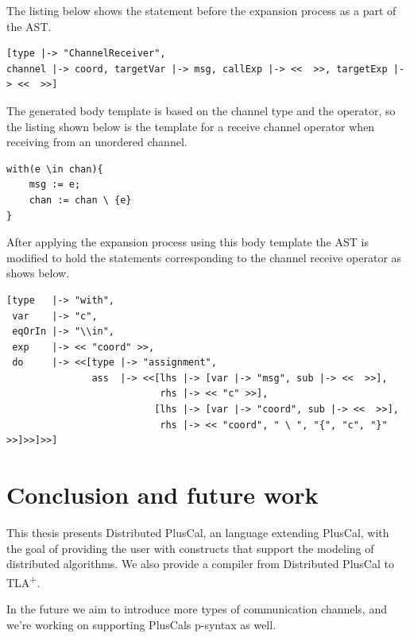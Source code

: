 \documentclass{thesul}
\newcommand{\tlaplus}{TLA\textsuperscript{+}\xspace}
\begin{document}
The listing below shows the statement before the expansion process as a part of the AST.

\begin{lstlisting}
[type |-> "ChannelReceiver",
channel |-> coord, targetVar |-> msg, callExp |-> <<  >>, targetExp |-> <<  >>]

\end{lstlisting}

The generated body template is based on the channel type and the operator, so the listing shown below is the template for a receive channel operator when receiving from an unordered channel.

\begin{lstlisting}
with(e \in chan){
	msg := e;
	chan := chan \ {e}
}
\end{lstlisting}

After applying the expansion process using this body template the AST is modified to hold the statements corresponding to the channel receive operator as shows below.

\begin{lstlisting}
[type   |-> "with", 
 var    |-> "c",
 eqOrIn |-> "\\in",
 exp    |-> << "coord" >>,
 do     |-> <<[type |-> "assignment",
               ass  |-> <<[lhs |-> [var |-> "msg", sub |-> <<  >>],
                           rhs |-> << "c" >>], 
                          [lhs |-> [var |-> "coord", sub |-> <<  >>],
                           rhs |-> << "coord", " \ ", "{", "c", "}" >>]>>]>>]

\end{lstlisting}

\label{chanexpand}
\chapter{Conclusion and future work}

This thesis presents Distributed PlusCal, an language extending PlusCal, with the goal of providing the user with constructs that support the modeling of distributed algorithms. We also provide a compiler from Distributed PlusCal to \tlaplus.

In the future we aim to introduce more types of communication channels, and we're working on supporting PlusCals p-syntax as well.
\end{document}
